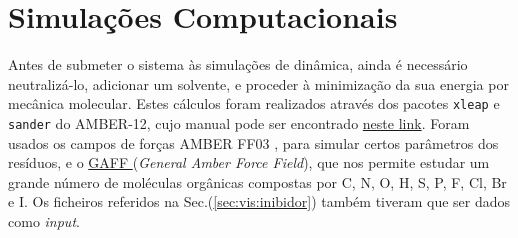 \documentclass[12pt,a4paper]{article}
\begin{document}
	
	
	
\section{Simulações Computacionais}
	
	
	Antes de submeter o sistema às simulações de dinâmica, ainda é necessário neutralizá-lo, adicionar um solvente, e proceder à minimização da sua energia por mecânica molecular. Estes cálculos foram realizados através dos pacotes \verb|xleap| e \verb|sander| do AMBER-12, cujo manual pode ser encontrado \href{https://ambermd.org/doc12/Amber12.pdf}{neste link}. Foram usados os campos de forças AMBER FF03 \cite{duanPointchargeForceField2003,zhangWellbalancedForceField2019}, para simular certos parâmetros dos resíduos, e o \href{https://ambermd.org/antechamber/gaff.html}{GAFF } (\textit{General Amber Force Field}), que nos permite estudar um grande número de moléculas orgânicas compostas por C, N, O, H, S, P, F, Cl, Br e I. Os ficheiros referidos na Sec.(\ref{sec:vis:inibidor}) também tiveram que ser dados como \textit{input}.
	
\end{document}
